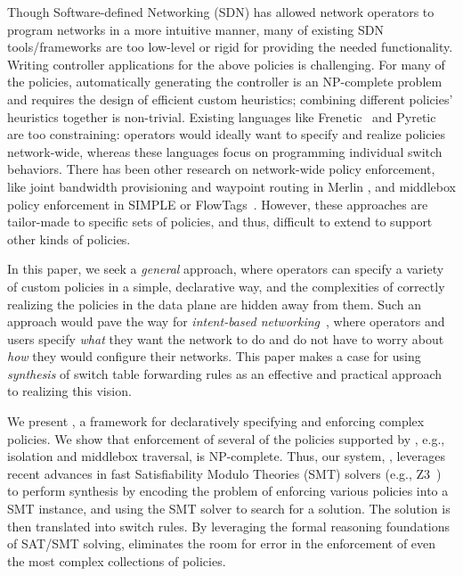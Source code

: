 Though Software-defined Networking (SDN) has allowed network operators
to program networks in a more intuitive manner, many of existing SDN
tools/frameworks are too low-level or rigid for providing the needed
functionality. Writing controller applications for the above policies
is challenging. For many of the policies, automatically generating the controller is an
NP-complete problem and requires the design of efficient custom heuristics;
combining different policies' heuristics together is
non-trivial. Existing languages like Frenetic~\cite{frenetic} and
Pyretic~\cite{pyretic} are too constraining: operators would ideally
want to specify and realize policies network-wide, whereas these
languages focus on programming individual switch behaviors.    There has been other research on
network-wide policy enforcement, like joint bandwidth provisioning and
waypoint routing in Merlin \cite{Merlin}, and middlebox policy
enforcement in SIMPLE \cite{simple} or
FlowTags~\cite{flowtags}. However, these approaches are tailor-made to
specific sets of policies, and thus, difficult to extend to support
other kinds of policies.

In this paper, we seek a {\em general} approach, where operators can
specify a variety of custom policies in a simple, declarative way, and
the complexities of correctly realizing the policies in the data plane
are hidden away from them. Such an approach would pave the way for
{\em intent-based networking}~\cite{}, where operators and users
specify {\em what} they want the network to do and do not have to
worry about {\em how} they would configure their
networks. %
This paper makes a case for using \emph{synthesis} of switch table
forwarding rules as an effective and practical approach to realizing
this vision.

We present \Name, a framework for declaratively specifying and enforcing 
complex policies.
We show that enforcement of several of the policies supported by
\Name, e.g., isolation and middlebox traversal, is NP-complete. Thus,
our system, \Name, leverages recent advances in fast Satisfiability
Modulo Theories (SMT) solvers
(e.g., Z3~\cite{z3}) to perform synthesis by encoding the problem of
enforcing various policies into a SMT instance, and using the SMT
solver to search for a solution. The solution is then translated into
switch rules. %
By leveraging the formal reasoning foundations of SAT/SMT solving,
\Name eliminates the room for error in the enforcement of even the
most complex collections of policies.

